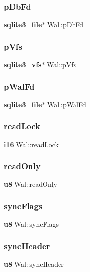 \subsubsection{pDbFd}
{\footnotesize\ttfamily \textbf{ sqlite3\+\_\+file}$\ast$ Wal\+::p\+Db\+Fd}

\mbox{\label{struct_wal_a5431b060acbc998a7e3710587abaa11e}} 
\subsubsection{pVfs}
{\footnotesize\ttfamily \textbf{ sqlite3\+\_\+vfs}$\ast$ Wal\+::p\+Vfs}

\mbox{\label{struct_wal_aea2a72ead42cfe57e3a6809e80884397}} 
\subsubsection{pWalFd}
{\footnotesize\ttfamily \textbf{ sqlite3\+\_\+file}$\ast$ Wal\+::p\+Wal\+Fd}

\mbox{\label{struct_wal_a260550c859ac7224fbdad0586dca664a}} 
\subsubsection{readLock}
{\footnotesize\ttfamily \textbf{ i16} Wal\+::read\+Lock}

\mbox{\label{struct_wal_a38f0810e34bdc89acdf27574473c0495}} 
\subsubsection{readOnly}
{\footnotesize\ttfamily \textbf{ u8} Wal\+::read\+Only}

\mbox{\label{struct_wal_ac1382875f5fe049ccf09f1c2d370c429}} 
\subsubsection{syncFlags}
{\footnotesize\ttfamily \textbf{ u8} Wal\+::sync\+Flags}

\mbox{\label{struct_wal_ae3de9666170c103a835a2c767932d3f9}} 
\subsubsection{syncHeader}
{\footnotesize\ttfamily \textbf{ u8} Wal\+::sync\+Header}

